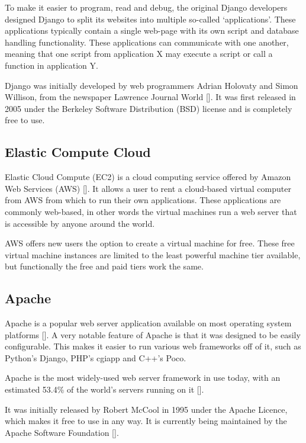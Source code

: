 To make it easier to program, read and debug, the original Django developers
designed Django to split its websites into multiple so-called `applications'.
These applications typically contain a single web-page with its own script and
database handling functionality. These applications can communicate with one
another, meaning that one script from application X may execute a script or
call a function in application Y.

Django was initially developed by web programmers Adrian Holovaty and Simon Willison, from the
newspaper Lawrence Journal World [\cite{website:django-exist}]. It was first released in 2005
under the Berkeley Software Distribution (BSD) license and is completely free to use.

\subsection{Elastic Compute Cloud}
\label{sec:ec2}

Elastic Cloud Compute (EC2) is a cloud computing service offered by Amazon Web
Services (AWS) [\cite{website:aws}]. It allows a user to rent a cloud-based
virtual computer from AWS from which to run their own applications.
These applications are commonly web-based, in other words the virtual machines run a
web server that is accessible by anyone around the world.  

AWS offers new users the option to create a virtual machine for free. These free
virtual machine instances are limited to the least powerful machine tier available, but
functionally the free and paid tiers work the same.

\subsection{Apache}
\label{sec:apache}

Apache is a popular web server application available on most operating system
platforms [\cite{website:apache-platforms}].
A very notable feature of Apache is that it was designed to be easily
configurable. This makes it easier to run various web frameworks off of it, such
as Python's Django, PHP's cgiapp and C++'s Poco.

Apache is the most widely-used web server framework in use today, with an
estimated 53.4\% of the world's servers running on it [\cite{website:apache-usage}].

It was initially released by Robert McCool in 1995 under the Apache Licence, which makes it
free to use in any way. It is currently being maintained by the Apache Software
Foundation [\cite{website:apache}].

